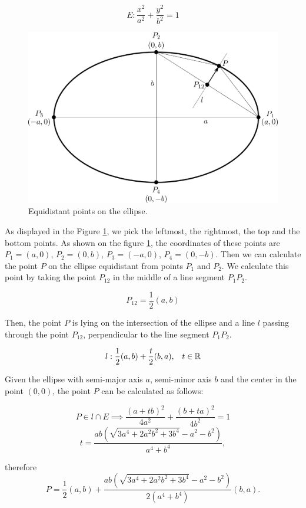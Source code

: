 $$E: \frac{x^2}{a^2} + \frac{y^2}{b^2} = 1$$
\begin{figure}
    \centerline{\includegraphics[scale=0.5]{images/img13}}
    \caption[Equidistant points on ellipse.]
    {Equidistant points on the ellipse.}
    \label{img:13}
\end{figure}
As displayed in the Figure \ref{img:13}, we pick the leftmost, the rightmost, the top
and the bottom points. As shown on the figure \ref{img:13}, the coordinates of these 
points are $P_1 = (a, 0)$, $P_2 = (0, b)$, $P_3=(-a, 0)$, $P_4 = (0, -b)$.
Then we can calculate the point $P$ on the ellipse equidistant
from points $P_1$ and $P_2$. We calculate this point by taking the point $P_{12}$ 
in the middle of a line segment $P_1P_2$. 

$$P_{12} = \frac{1}{2}(a, b)$$

Then, the point $P$ is lying on the
intersection of the ellipse and a line $l$ passing through the point $P_{12}$, perpendicular to the
line segment $P_1P_2$.

$$l: \frac{1}{2}(a,b) + \frac{t}{2}(b,a), \hspace{3mm} t \in \mathbb{R}$$

Given the ellipse with semi-major axis $a$, 
semi-minor axis $b$ and the center in the point $(0, 0)$, the point $P$ can be 
calculated as follows:

$$P \in l \cap E \implies 
\frac{(a+tb)^2}{4a^2} + \frac{(b+ta)^2}{4b^2} = 1$$
$$t=\frac{ab(\sqrt{3a^4+2a^2b^2+3b^4}-a^2-b^2)}{a^4+b^4},$$

therefore 
$$P=\frac{1}{2}(a,b) + \frac{ab(\sqrt{3a^4+2a^2b^2+3b^4}-a^2-b^2)}{2(a^4+b^4)}(b,a).$$

